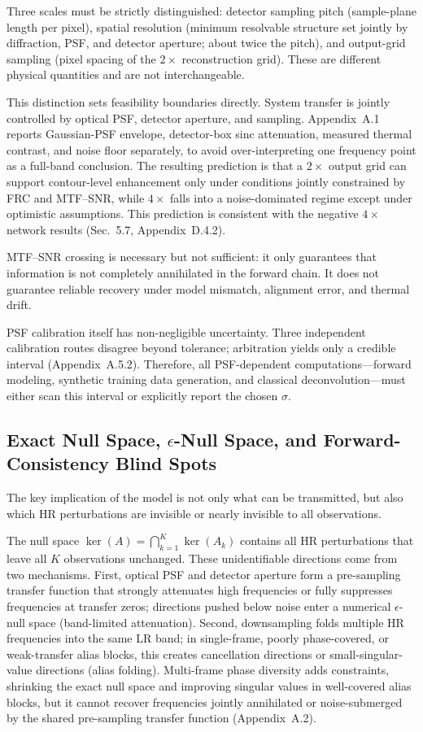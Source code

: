 Three scales must be strictly distinguished: detector sampling pitch (sample-plane length per pixel), spatial resolution (minimum resolvable structure set jointly by diffraction, PSF, and detector aperture; about twice the pitch), and output-grid sampling (pixel spacing of the $2\times$ reconstruction grid). These are different physical quantities and are not interchangeable.

This distinction sets feasibility boundaries directly. System transfer is jointly controlled by optical PSF, detector aperture, and sampling. Appendix~A.1 reports Gaussian-PSF envelope, detector-box sinc attenuation, measured thermal contrast, and noise floor separately, to avoid over-interpreting one frequency point as a full-band conclusion. The resulting prediction is that a $2\times$ output grid can support contour-level enhancement only under conditions jointly constrained by FRC and MTF--SNR, while $4\times$ falls into a noise-dominated regime except under optimistic assumptions. This prediction is consistent with the negative $4\times$ network results (Sec.~5.7, Appendix~D.4.2).

MTF--SNR crossing is necessary but not sufficient: it only guarantees that information is not completely annihilated in the forward chain. It does not guarantee reliable recovery under model mismatch, alignment error, and thermal drift.

PSF calibration itself has non-negligible uncertainty. Three independent calibration routes disagree beyond tolerance; arbitration yields only a credible interval (Appendix~A.5.2). Therefore, all PSF-dependent computations---forward modeling, synthetic training data generation, and classical deconvolution---must either scan this interval or explicitly report the chosen $\sigma$.

\subsection{Exact Null Space, \texorpdfstring{$\epsilon$}{epsilon}-Null Space, and Forward-Consistency Blind Spots}

The key implication of the model is not only what can be transmitted, but also which HR perturbations are invisible or nearly invisible to all observations.

The null space $\ker(A)=\bigcap_{k=1}^{K}\ker(A_k)$ contains all HR perturbations that leave all $K$ observations unchanged. These unidentifiable directions come from two mechanisms. First, optical PSF and detector aperture form a pre-sampling transfer function that strongly attenuates high frequencies or fully suppresses frequencies at transfer zeros; directions pushed below noise enter a numerical $\epsilon$-null space (band-limited attenuation). Second, downsampling folds multiple HR frequencies into the same LR band; in single-frame, poorly phase-covered, or weak-transfer alias blocks, this creates cancellation directions or small-singular-value directions (alias folding). Multi-frame phase diversity adds constraints, shrinking the exact null space and improving singular values in well-covered alias blocks, but it cannot recover frequencies jointly annihilated or noise-submerged by the shared pre-sampling transfer function (Appendix~A.2).

